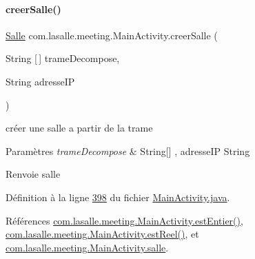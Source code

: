 \mbox{\label{classcom_1_1lasalle_1_1meeting_1_1_main_activity_a882bcd3e88633b5190d60625bb70dd43}} 
\paragraph{\texorpdfstring{creer\+Salle()}{creerSalle()}}
{\footnotesize\ttfamily \hyperlink{classcom_1_1lasalle_1_1meeting_1_1_salle}{Salle} com.\+lasalle.\+meeting.\+Main\+Activity.\+creer\+Salle (\begin{DoxyParamCaption}\item[{String \mbox{[}$\,$\mbox{]}}]{trame\+Decompose,  }\item[{String}]{adresse\+IP }\end{DoxyParamCaption})}



créer une salle a partir de la trame 


\begin{DoxyParams}{Paramètres}
{\em trame\+Decompose} & String\mbox{[}\mbox{]} , adresse\+IP String \\
\hline
\end{DoxyParams}
\begin{DoxyReturn}{Renvoie}
salle 
\end{DoxyReturn}


Définition à la ligne \hyperlink{_main_activity_8java_source_l00398}{398} du fichier \hyperlink{_main_activity_8java_source}{Main\+Activity.\+java}.



Références \hyperlink{_main_activity_8java_source_l00484}{com.\+lasalle.\+meeting.\+Main\+Activity.\+est\+Entier()}, \hyperlink{_main_activity_8java_source_l00502}{com.\+lasalle.\+meeting.\+Main\+Activity.\+est\+Reel()}, et \hyperlink{_main_activity_8java_source_l00063}{com.\+lasalle.\+meeting.\+Main\+Activity.\+salle}.


